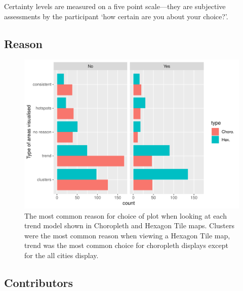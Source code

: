 \documentclass[conference,final,]{IEEEtran}
\makeatletter
\def\maxwidth{\ifdim\Gin@nat@width>\linewidth\linewidth
\else\Gin@nat@width\fi}
\let\Oldincludegraphics\includegraphics
\renewcommand{\includegraphics}[1]{\Oldincludegraphics[width=\maxwidth]{#1}}
\makeatother
\begin{document}
Certainty levels are measured on a five point scale---they are
subjective assessments by the participant `how certain are you about
your choice?'.

\hypertarget{reason}{%
\subsection{Reason}\label{reason}}

\begin{figure}
\centering
\includegraphics{paper_files/figure-latex/unnamed-chunk-3-1.pdf}
\caption{The most common reason for choice of plot when looking at each
trend model shown in Choropleth and Hexagon Tile maps. Clusters were the
most common reason when viewing a Hexagon Tile map, trend was the most
common choice for choropleth displays except for the all cities
display.}
\end{figure}

\hypertarget{contributors}{%
\subsection{Contributors}\label{contributors}}
\end{document}
